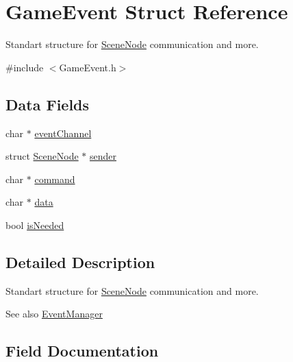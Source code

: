 \hypertarget{struct_game_event}{}\section{Game\+Event Struct Reference}
\label{struct_game_event}


Standart structure for \hyperlink{struct_scene_node}{Scene\+Node} communication and more.  




{\ttfamily \#include $<$Game\+Event.\+h$>$}

\subsection*{Data Fields}
\begin{DoxyCompactItemize}
\item 
char $\ast$ \hyperlink{struct_game_event_a7dda51a2020c9e6ea2d284527a6c0a3c}{event\+Channel}
\item 
struct \hyperlink{struct_scene_node}{Scene\+Node} $\ast$ \hyperlink{struct_game_event_a66ff5dae3a3a9fa193714623f219c11d}{sender}
\item 
char $\ast$ \hyperlink{struct_game_event_ade9cba72805fe52685a1deea307a8e82}{command}
\item 
char $\ast$ \hyperlink{struct_game_event_a91a70b77df95bd8b0830b49a094c2acb}{data}
\item 
bool \hyperlink{struct_game_event_a1c2e66c0da32aeb6b56a788ad2beee8c}{is\+Needed}
\end{DoxyCompactItemize}


\subsection{Detailed Description}
Standart structure for \hyperlink{struct_scene_node}{Scene\+Node} communication and more. 

\begin{DoxySeeAlso}{See also}
\hyperlink{struct_event_manager}{Event\+Manager} 
\end{DoxySeeAlso}


\subsection{Field Documentation}
\hypertarget{struct_game_event_ade9cba72805fe52685a1deea307a8e82}{}\label{struct_game_event_ade9cba72805fe52685a1deea307a8e82} 
